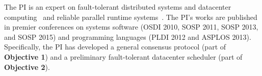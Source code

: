 The PI is an expert on fault-tolerant distributed systems and datacenter 
computing~\cite{crane:sosp15, tripod:apsys16} and reliable parallel 
runtime systems~\cite{smt:cacm, cui:tern:osdi10, peregrine:sosp11, 
parrot:sosp13}. The PI's works are published in premier conferences on systems 
software (OSDI 2010, SOSP 2011, SOSP 2013, and SOSP 2015) and programming 
languages (PLDI 2012 and ASPLOS 2013). Specifically, the PI has developed a 
general consensus protocol (part of \textbf{Objective 1}) and a preliminary 
fault-tolerant datacenter scheduler (part of \textbf{Objective 2}).




